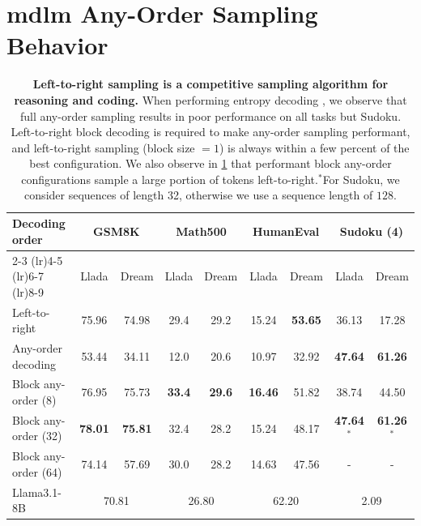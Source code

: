 \section{\gls{mdlm} Any-Order Sampling Behavior}\label{appsec:observations}

\begin{table}[h]
    \centering
    \begin{tabular}{lcccccccc}
    \toprule
       \textbf{Decoding order}  
       & \multicolumn{2}{c}{\textbf{GSM8K}} 
       & \multicolumn{2}{c}{\textbf{Math500}}  
       & \multicolumn{2}{c}{\textbf{HumanEval}}  
       & \multicolumn{2}{c}{\textbf{Sudoku (4)}} \\    
    \cmidrule(lr){2-3} \cmidrule(lr){4-5} \cmidrule(lr){6-7} \cmidrule(lr){8-9}
       & Llada & Dream 
       & Llada & Dream 
       & Llada & Dream 
       & Llada & Dream \\
    \midrule       
        Left-to-right   & 75.96  & 74.98  & 29.4 & 29.2  & 15.24  & \textbf{53.65}  & 36.13 & 17.28 \\
        Any-order decoding      & 53.44  & 34.11  & 12.0  & 20.6  & 10.97  & 32.92  & \textbf{47.64} & \textbf{61.26} \\
        \midrule
        Block any-order (8)        & 76.95  &  75.73  & \textbf{33.4}  & \textbf{29.6}  & \textbf{16.46}  & 51.82 & 38.74 & 44.50  \\
        Block any-order (32)       & \textbf{78.01}  & \textbf{75.81}  & 32.4  & 28.2 & 15.24 & 48.17  & \textbf{47.64}$^*$ & \textbf{61.26}$^*$ \\
        Block any-order (64)       & 74.14 & 57.69  & 30.0  & 28.2  & 14.63 & 47.56  & - & - \\
        \midrule
        Llama3.1-8B & \multicolumn{2}{c}{70.81} & \multicolumn{2}{c}{26.80} & \multicolumn{2}{c}{62.20} & \multicolumn{2}{c}{2.09} \\
    \bottomrule        
    \end{tabular}
    \caption{\textbf{Left-to-right sampling is a competitive sampling algorithm for reasoning and coding.} When performing entropy decoding \citep{ye2025dream}, we observe that full any-order sampling results in poor performance on all tasks but Sudoku. Left-to-right block decoding is required to make any-order sampling performant, and left-to-right sampling (block size $=1$) is always within a few percent of the best configuration. We also observe in \cref{appsec:observations} that performant block any-order configurations sample a large portion of tokens left-to-right.$^*$For Sudoku, we consider sequences of length 32, otherwise we use a sequence length of $128$.} 
    \label{tab:decoding_strategies}
\end{table}

